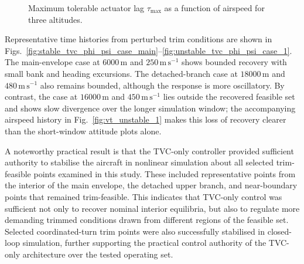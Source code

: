 \documentclass[conf]{new-aiaa}
\begin{document}
\begin{figure}[!h]
\centering
{}
\caption{Maximum tolerable actuator lag $\tau_{\max}$ as a function of airspeed for three altitudes.}
\label{fig:tau_max}
\end{figure}

Representative time histories from perturbed trim conditions are shown in Figs.~\ref{fig:stable_tvc_phi_psi_case_main}--\ref{fig:unstable_tvc_phi_psi_case_1}. The main-envelope case at $6000\,\mathrm{m}$ and $250\,\mathrm{m\,s}^{-1}$ shows bounded recovery with small bank and heading excursions. The detached-branch case at $18000\,\mathrm{m}$ and $480\,\mathrm{m\,s}^{-1}$ also remains bounded, although the response is more oscillatory. By contrast, the case at $16000\,\mathrm{m}$ and $450\,\mathrm{m\,s}^{-1}$ lies outside the recovered feasible set and shows slow divergence over the longer simulation window; the accompanying airspeed history in Fig.~\ref{fig:vt_unstable_1} makes this loss of recovery clearer than the short-window attitude plots alone.

A noteworthy practical result is that the TVC-only controller provided sufficient authority to stabilise the aircraft in nonlinear simulation about all selected trim-feasible points examined in this study. These included representative points from the interior of the main envelope, the detached upper branch, and near-boundary points that remained trim-feasible. This indicates that TVC-only control was sufficient not only to recover nominal interior equilibria, but also to regulate more demanding trimmed conditions drawn from different regions of the feasible set. Selected coordinated-turn trim points were also successfully stabilised in closed-loop simulation, further supporting the practical control authority of the TVC-only architecture over the tested operating set.
\end{document}
